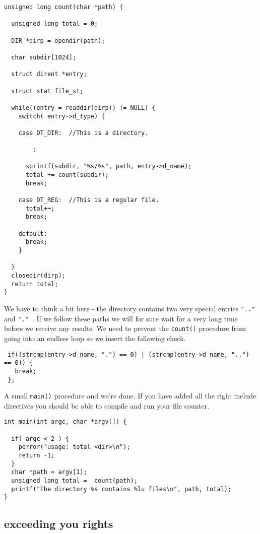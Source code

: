 \documentclass[a4paper,11pt]{article}
\begin{document}
\begin{lstlisting}
unsigned long count(char *path) {

  unsigned long total = 0;
  
  DIR *dirp = opendir(path);

  char subdir[1024];  
  
  struct dirent *entry;

  struct stat file_st;
  
  while((entry = readdir(dirp)) != NULL) {
    switch( entry->d_type) {

    case DT_DIR:  //This is a directory.
    
        :
    
      sprintf(subdir, "%s/%s", path, entry->d_name);
      total += count(subdir);
      break;

    case DT_REG:  //This is a regular file.
      total++;
      break;

    default:  
      break;
    }

  }
  closedir(dirp);  
  return total;
}  
\end{lstlisting}

We have to think a bit here - the directory contains two very special
entries {\tt ".."} and {\tt "." }. If we follow these paths we will
for sure wait for a very long time before we receive any results. We
need to prevent the {\tt count()} procedure from going into an endless
loop so we insert the following check.

\begin{lstlisting}
 if((strcmp(entry->d_name, ".") == 0) | (strcmp(entry->d_name, "..") == 0)) {
   break;
 };
\end{lstlisting}

A small {\tt main()} procedure and we're done. If you have added all
the right include directives you should be able to compile and run
your file counter.

\begin{lstlisting}
int main(int argc, char *argv[]) {

  if( argc < 2 ) {
    perror("usage: total <dir>\n");
    return -1;
  }
  char *path = argv[1];
  unsigned long total =  count(path);
  printf("The directory %s contains %lu files\n", path, total);
}
\end{lstlisting}

\subsection{exceeding you rights}
\end{document}
